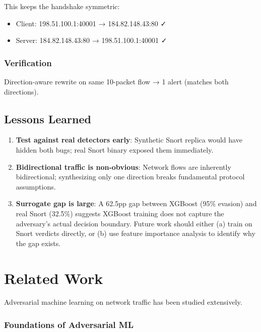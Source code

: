 \documentclass[12pt,a4paper]{report}
\begin{document}
This keeps the handshake symmetric:
\begin{itemize}
  \item Client: 198.51.100.1:40001 → 184.82.148.43:80 ✓
  \item Server: 184.82.148.43:80 → 198.51.100.1:40001 ✓
\end{itemize}

\subsection{Verification}
Direction-aware rewrite on same 10-packet flow → 1 alert (matches both directions).

\section{Lessons Learned}

\begin{enumerate}
  \item \textbf{Test against real detectors early}: Synthetic Snort replica would have hidden both bugs; real Snort binary exposed them immediately.
  
  \item \textbf{Bidirectional traffic is non-obvious}: Network flows are inherently bidirectional; synthesizing only one direction breaks fundamental protocol assumptions.
  
  \item \textbf{Surrogate gap is large}: A 62.5pp gap between XGBoost (95\% evasion) and real Snort (32.5\%) suggests XGBoost training does not capture the adversary's actual decision boundary. Future work should either (a) train on Snort verdicts directly, or (b) use feature importance analysis to identify why the gap exists.
\end{enumerate}

\chapter{Related Work}

Adversarial machine learning on network traffic has been studied extensively.

\subsection{Foundations of Adversarial ML}
\end{document}
